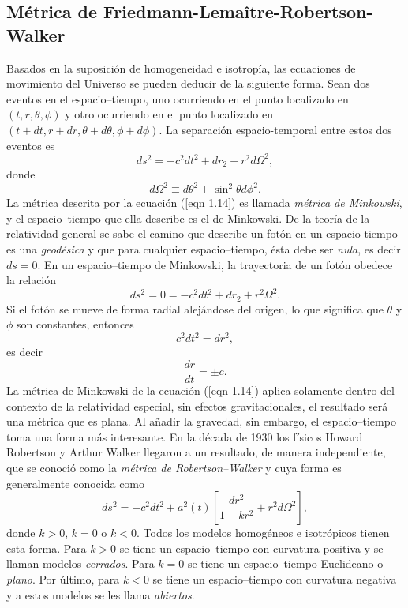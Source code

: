 \documentclass[a4paper,openright,12pt]{book}
\begin{document}

\subsection*{Métrica de Friedmann-Lemaître-Robertson-Walker}
Basados en la suposición de homogeneidad e isotropía, las ecuaciones de movimiento del Universo se pueden deducir de la siguiente forma. Sean dos eventos en el espacio--tiempo, uno ocurriendo en el punto localizado en $(t,r,\theta , \phi)$ y otro ocurriendo en el punto localizado en $(t +dt, r + dr, \theta + d\theta, \phi + d\phi)$. La separación espacio-temporal entre estos dos eventos es
\begin{equation}
ds^{2}=-c^{2}dt^{2} + dr_{2} +r^{2}d\Omega^{2},\label{eqn 1.14}
\end{equation}
donde
\begin{equation*}
d\Omega^{2} \equiv d\theta^{2} + \sin^{2}\theta d\phi^{2}.
\end{equation*}
La métrica descrita por la ecuación (\ref{eqn 1.14}) es llamada \textit{métrica de Minkowski}, y el espacio--tiempo que ella describe es el de Minkowski. De la teoría de la relatividad general se sabe el camino que describe un fotón en un espacio-tiempo es una \textit{geodésica} y que para cualquier espacio--tiempo, ésta debe ser \textit{nula}, es decir $ds=0$. En un espacio--tiempo de Minkowski, la trayectoria de un fotón obedece la relación
\begin{equation}
ds^{2}=0 = -c^{2}dt^{2} + dr_{2} +r^{2}\Omega^{2}.\label{eqn 1.15}
\end{equation}
Si el fotón se mueve de forma radial alejándose del origen, lo que significa que $\theta$ y $\phi$ son constantes, entonces
\begin{equation}
c^{2}dt^{2}=dr^{2},\label{eqn 1.16}
\end{equation}
es decir
\begin{equation}
\frac{dr}{dt}=\pm c. \label{eqn 1.17}
\end{equation}
La métrica de Minkowski de la ecuación (\ref{eqn 1.14}) aplica solamente dentro del contexto de la relatividad especial, sin efectos gravitacionales, el resultado será una  métrica que es plana. Al añadir la gravedad, sin embargo, el espacio--tiempo toma una forma más interesante. En la década de 1930 los físicos Howard Robertson y Arthur Walker llegaron a un resultado, de manera independiente, que se conoció como la \textit{métrica de Robertson--Walker} y cuya forma es generalmente conocida como
\begin{equation}
ds^{2}
=
-c^{2}dt^{2} + a^{2}(t)
\left[
\frac{dr^{2}}{1-k r^{2}} + r^{2}d\Omega^{2}
\right],\label{eqn 1.18}
\end{equation}
donde $k > 0$, $k = 0$ o $k < 0$. Todos los modelos homogéneos e isotrópicos tienen esta forma. Para $k > 0$ se tiene un espacio--tiempo con curvatura positiva y se llaman modelos \textit{cerrados}. Para $k = 0$ se tiene un espacio--tiempo Euclideano o \textit{plano}. Por último, para $k < 0$ se tiene un espacio--tiempo con curvatura negativa y a estos modelos se les llama \textit{abiertos}.
\end{document}
